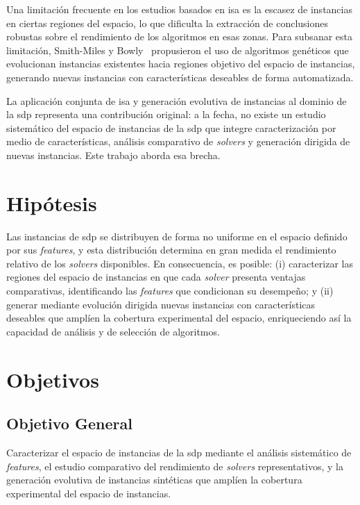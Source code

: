 Una limitación frecuente en los estudios basados en \acrshort{isa} es la escasez de
instancias en ciertas regiones del espacio, lo que dificulta la extracción de conclusiones
robustas sobre el rendimiento de los algoritmos en esas zonas.
Para subsanar esta limitación, Smith-Miles y Bowly~\cite{smith-milesGeneratingNewTest2015}
propusieron el uso de algoritmos genéticos que evolucionan instancias existentes hacia
regiones objetivo del espacio de instancias, generando nuevas instancias con características
deseables de forma automatizada.

La aplicación conjunta de \acrshort{isa} y generación evolutiva de instancias al dominio de
la \acrshort{sdp} representa una contribución original: a la fecha, no existe un estudio
sistemático del espacio de instancias de la \acrshort{sdp} que integre caracterización
por medio de características, análisis comparativo de \textit{solvers} y generación dirigida de nuevas instancias.
Este trabajo aborda esa brecha.

\section{Hipótesis}%

Las instancias de \acrshort{sdp} se distribuyen de forma no uniforme en el espacio definido
por sus \textit{features}, y esta distribución determina en gran medida el
rendimiento relativo de los \textit{solvers} disponibles. En consecuencia, es posible: (i) caracterizar
las regiones del espacio de instancias en que cada \textit{solver} presenta ventajas comparativas,
identificando las \textit{features} que condicionan su desempeño; y (ii) generar mediante
evolución dirigida nuevas instancias con características deseables que amplíen la
cobertura experimental del espacio, enriqueciendo así la capacidad de análisis y de selección de
algoritmos.

\section{Objetivos}

\subsection{Objetivo General}%

Caracterizar el espacio de instancias de la \acrfull{sdp} mediante el análisis sistemático de
\textit{features}, el estudio comparativo del rendimiento de \textit{solvers} representativos,
y la generación evolutiva de instancias sintéticas que amplíen la cobertura experimental del espacio de
instancias.

